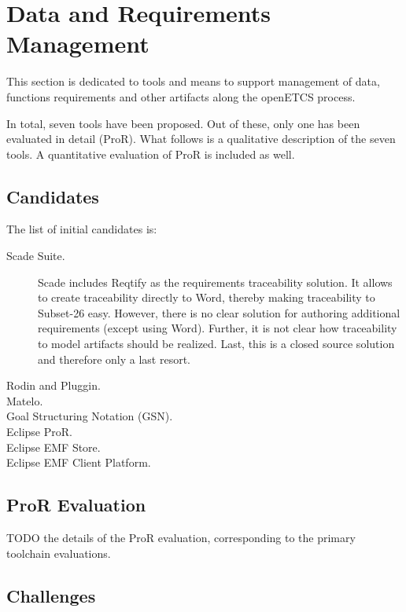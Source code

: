 

\chapter{Data and Requirements Management}
\label{sec:management}

 
This section is dedicated to tools and means to support management of data, functions requirements and other artifacts along  the openETCS process.

In total, seven tools have been proposed.  Out of these, only one has been evaluated in detail (ProR).  What follows is a qualitative description of the seven tools.  A quantitative evaluation of ProR is included as well.

\section{Candidates}
The list of initial candidates is:

\begin{description}
\item[Scade Suite.]  Scade includes Reqtify as the requirements traceability solution.  It allows to create traceability directly to Word, thereby making traceability to Subset-26 easy.  However, there is no clear solution for authoring additional requirements (except using Word).  Further, it is not clear how traceability to model artifacts should be realized.  Last, this is a closed source solution and therefore only a last resort.
\item[Rodin and Pluggin.]
\item[Matelo.]
\item[Goal Structuring Notation (GSN).]
\item[Eclipse ProR.]
\item[Eclipse EMF Store.]
\item[Eclipse EMF Client Platform.]
\end{description}

\section{ProR Evaluation}

TODO the details of the ProR evaluation, corresponding to the primary toolchain evaluations.

\section{Challenges}

